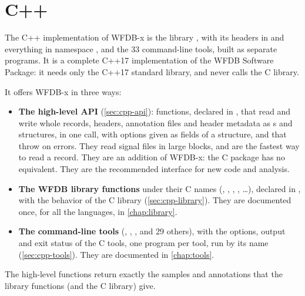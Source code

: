 \chapter{C++}
\label{chap:cpp}

The C++ implementation of WFDB-x is the library , with its headers in
 and everything in namespace , and the 33
command-line tools, built as separate programs. It is a complete C++17 implementation of
the WFDB Software Package: it needs only the C++17 standard library, and never calls the
C library.

It offers WFDB-x in three ways:
\begin{itemize}
\item \textbf{The high-level API} (\cref{sec:cpp-api}): functions, declared in
  , that read and write whole records, headers, annotation files
  and header metadata as s and structures, in one call, with options
  given as fields of a structure, and that throw  on errors. They read
  signal files in large blocks, and are the fastest way to read a record. They are an
  addition of WFDB-x: the C package has no equivalent. They are the recommended interface
  for new code and analysis.
\item \textbf{The WFDB library functions} under their C names (,
  , , , \ldots), declared in
  , with the behavior of the C library (\cref{sec:cpp-library}).
  They are documented once, for all the languages, in \cref{chap:library}.
\item \textbf{The command-line tools} (, , ,
   and 29 others), with the options, output and exit status of the C tools,
  one program per tool, run by its name (\cref{sec:cpp-tools}). They are documented in
  \cref{chap:tools}.
\end{itemize}
The high-level functions return exactly the samples and annotations that the library
functions (and the C library) give.

